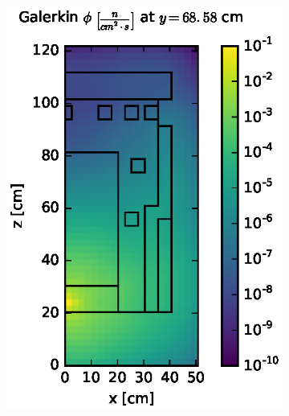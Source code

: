 \documentclass{article} %
\begin{document}
\begin{figure}[!htb]
\begin{subfigure}{0.4\textwidth}
\includegraphics[max height=0.445\textheight]
{dlvn-fwd-flux-gkn04.eps}
\end{subfigure}
\\
\begin{subfigure}{0.4\textwidth}

\end{subfigure}
\end{figure}
\end{document}
